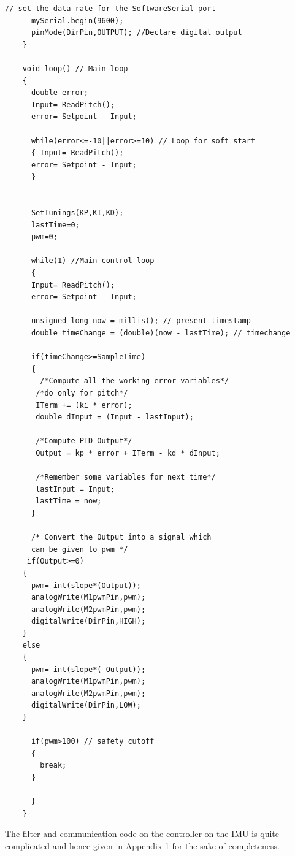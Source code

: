 \documentclass[a4paper , 12pt]{article}
\begin{document}
\begin{lstlisting}[frame=single]
	  // set the data rate for the SoftwareSerial port
	  mySerial.begin(9600);
	  pinMode(DirPin,OUTPUT); //Declare digital output
	}
	
	void loop() // Main loop
	{
	  double error;
	  Input= ReadPitch();
	  error= Setpoint - Input;
	 
	  while(error<=-10||error>=10) // Loop for soft start
	  { Input= ReadPitch();
	  error= Setpoint - Input;
	  }
	  
	 
	  SetTunings(KP,KI,KD);
	  lastTime=0;
	  pwm=0;
	 
	  while(1) //Main control loop
	  {
	  Input= ReadPitch();
	  error= Setpoint - Input;
	   
	  unsigned long now = millis(); // present timestamp
	  double timeChange = (double)(now - lastTime); // timechange
	  
	  if(timeChange>=SampleTime)
	  {
	    /*Compute all the working error variables*/
	   /*do only for pitch*/
	   ITerm += (ki * error);
	   double dInput = (Input - lastInput);
	  
	   /*Compute PID Output*/
	   Output = kp * error + ITerm - kd * dInput;
	  
	   /*Remember some variables for next time*/
	   lastInput = Input;
	   lastTime = now;
	  }
	  
	  /* Convert the Output into a signal which 
	  can be given to pwm */
	 if(Output>=0)
	{
	  pwm= int(slope*(Output));
	  analogWrite(M1pwmPin,pwm);
	  analogWrite(M2pwmPin,pwm);
	  digitalWrite(DirPin,HIGH);
	} 
	else
	{
	  pwm= int(slope*(-Output));
	  analogWrite(M1pwmPin,pwm);
	  analogWrite(M2pwmPin,pwm);
	  digitalWrite(DirPin,LOW);
	}
	  
	  if(pwm>100) // safety cutoff
	  {
	    break;
	  }
	  
	  }
	}
	\end{lstlisting} 
The filter and communication code on the controller on the IMU is quite complicated and hence given in Appendix-1 for the sake of completeness. 
\end{document}
